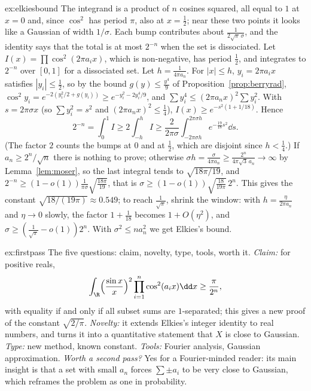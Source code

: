 \begin{solution}{ex:elkiesbound}
\idea The integrand is a product of $n$ cosines squared, all equal to $1$ at $x=0$ and, since $\cos^2$ has period $\pi$, also at $x=\frac12$; near these two points it looks like a Gaussian of width
$1/\sigma$. Each bump contributes about $\frac1{2\sqrt\pi\,\sigma}$, and the identity says that the total is at most $2^{-n}$ when the set is dissociated.
\writeup Let $I(x)=\prod\cos^2(2\pi a_ix)$, which is non-negative, has period $\frac12$, and integrates to $2^{-n}$ over $[0,1]$ for a dissociated set. Let $h=\frac1{4\pi a_n}$. For $|x|\le h$,
$y_i=2\pi a_ix$ satisfies $|y_i|\le\frac12$, so by the bound $g(y)\le\frac{y^4}9$ of Proposition~\ref{prop:berryrad}, $\cos^2y_i=e^{-2(y_i^2/2+g(y_i))}\ge e^{-y_i^2-2y_i^4/9}$, and $\sum y_i^4\le(2\pi a_nx)^2\sum y_i^2$. With
$s=2\pi\sigma x$ (so $\sum y_i^2=s^2$ and $(2\pi a_nx)^2\le\frac14$), $I(x)\ge e^{-s^2(1+1/18)}$. Hence
\[
2^{-n}=\int_0^1I\ge2\int_{-h}^hI\ge\frac2{2\pi\sigma}\int_{-2\pi\sigma h}^{2\pi\sigma h}e^{-\frac{19}{18}s^2}\dd s.
\]
(The factor $2$ counts the bumps at $0$ and at $\frac12$, which are disjoint since $h<\frac14$.) If $a_n\ge2^n/\sqrt n$ there is nothing to prove; otherwise $\sigma h=\frac\sigma{4\pi a_n}\ge
\frac{2^n}{4\pi\sqrt3\,a_n}\to\infty$ by Lemma~\ref{lem:moser}, so the last integral tends to $\sqrt{18\pi/19}$, and $2^{-n}\ge(1-o(1))\frac1{\pi\sigma}\sqrt{\frac{18\pi}{19}}$, that is
$\sigma\ge(1-o(1))\sqrt{\frac{18}{19\pi}}\,2^n$. This gives the constant $\sqrt{18/(19\pi)}\approx0.549$; to reach $\frac1{\sqrt\pi}$, shrink the window: with $h=\frac{\eta}{2\pi a_n}$ and $\eta\to0$
slowly, the factor $1+\frac1{18}$ becomes $1+O(\eta^2)$, and $\sigma\ge(\frac1{\sqrt\pi}-o(1))2^n$. With $\sigma^2\le na_n^2$ we get Elkies's bound.
\end{solution}

\begin{solution}{ex:firstpass}
\idea The five questions: claim, novelty, type, tools, worth it.
\writeup \emph{Claim:} for positive reals,
\[
\int_\R\Bigl(\frac{\sin x}{x}\Bigr)^2\prod_{i=1}^n\cos^2(a_ix)\dd x\ge\frac\pi{2^n},
\]
with equality if and only if all subset sums are $1$-separated; this gives a new proof of the constant $\sqrt{2/\pi}$.
\emph{Novelty:} it extends Elkies's integer identity to real numbers, and turns it into a quantitative statement that $X$ is close to Gaussian. \emph{Type:} new method, known constant.
\emph{Tools:} Fourier analysis, Gaussian approximation. \emph{Worth a second pass?} Yes for a Fourier-minded reader: its main insight is that a set with small $a_n$
forces $\sum\pm a_i$ to be very close to Gaussian, which reframes the problem as one in probability.
\end{solution}


